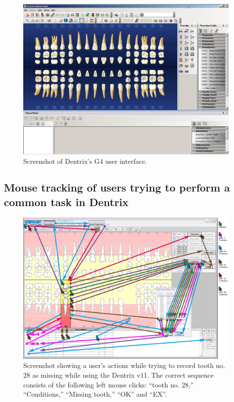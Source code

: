 \documentclass[11pt]{article}
\begin{document}
\begin{figure}[h]
\begin{center}
\includegraphics[width=\textwidth]{dentrixss1.png}
\end{center}
\caption{Screenshot of Dentrix's G4 user interface.}
\end{figure}

\newpage

\subsection{Mouse tracking of users trying to perform a common task in Dentrix}
\label{dentrixusabil}
\begin{figure}[h]
\begin{center}
\includegraphics[width=\textwidth]{dentrixuse.png}
\end{center}
\caption{Screenshot showing a user’s actions while trying to record tooth no. 28 as missing while using the Dentrix v11. The correct sequence consists of the following left mouse clicks: “tooth no. 28,” “Conditions,” “Missing tooth,” “OK” and “EX”\cite{Thyvalikakath2008A-usability-eva}.}
\end{figure}
\end{document}
